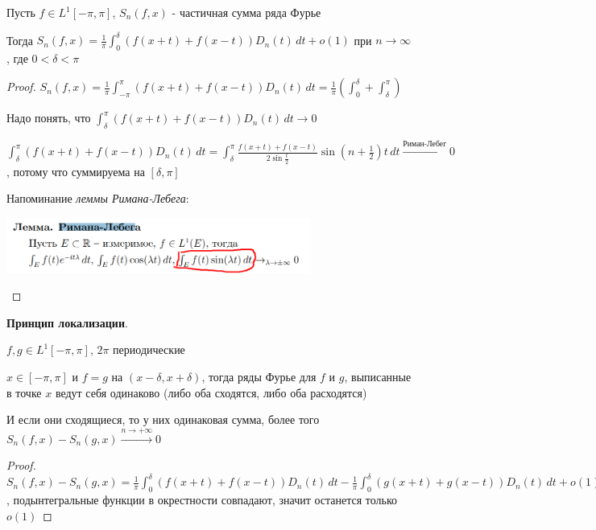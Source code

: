 \begin{consequence}
    Пусть $f \in L^1 [-\pi, \pi]$, $S_n (f, x)$ - частичная сумма ряда Фурье

    Тогда $S_n (f, x) = \frac{1}{\pi} \int_0^\delta (f(x + t) + f(x - t)) D_n (t) \, dt + o(1)$ при $n \to \infty$, где $0 < \delta < \pi$
\end{consequence}

\begin{proof}
    $S_n (f, x) = \frac{1}{\pi} \int_{-\pi}^\pi (f(x + t) + f(x - t)) D_n (t) \,  dt = \frac{1}{\pi} \left( \int_{0}^\delta + \int_\delta^\pi \right)$

    Надо понять, что $\int_{\delta}^\pi (f(x + t) + f(x - t)) D_n (t) \,  dt \rightarrow 0$

    $\int_{\delta}^\pi (f(x + t) + f(x - t)) D_n (t) \,  dt = \int_\delta^\pi \frac{f(x + t) + f(x - t)}{2 \sin \frac{t}{2}} \sin (n + \frac{1}{2}) t \, dt \overset{\text{Риман-Лебег}}{\rightarrow} 0$, потому что суммируема на $[\delta, \pi]$

    Напоминание \textit{леммы Римана-Лебега}:

    \begin{center}
        \includegraphics[width=10cm]{assets/05-fourierreihe/notice-riman-lebegue.png}
    \end{center}
\end{proof}

\begin{consequence}
    \textbf{Принцип локализации}.

    $f, g \in L^1 [-\pi, \pi]$, $2\pi$ периодические

    $x \in [-\pi, \pi]$ и $f = g$ на $(x - \delta, x + \delta)$, тогда ряды Фурье для $f$ и $g$, выписанные в точке $x$ ведут себя одинаково (либо оба сходятся, либо оба расходятся)

    И если они сходящиеся, то у них одинаковая сумма, более того $S_n (f, x) - S_n (g, x) \overset{n \to +\infty}{\rightarrow} 0$
\end{consequence}

\begin{proof}
    $S_n (f, x) - S_n (g, x) = \frac{1}{\pi} \int_0^\delta (f(x + t) + f(x - t)) D_n (t) \, dt - \frac{1}{\pi} \int_0^\delta (g(x + t) + g(x - t)) D_n (t) \, dt + o(1)$, подынтегральные функции в окрестности совпадают, значит останется только $o(1)$
\end{proof}

